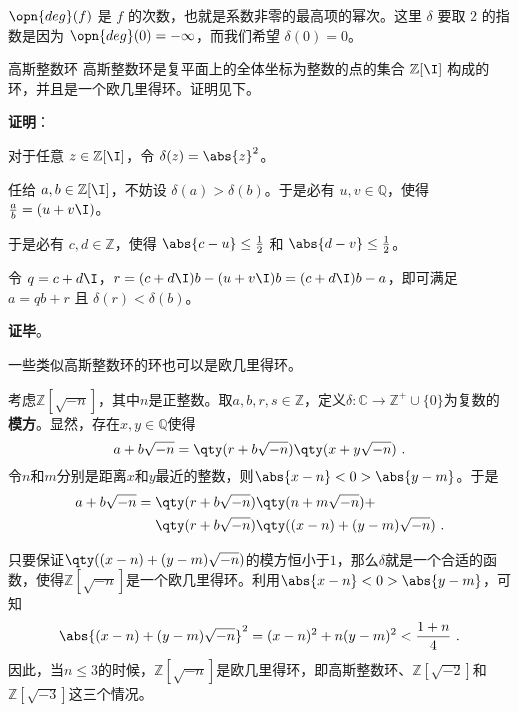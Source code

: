 $\opn{deg}(f)$ 是 $f$ 的次数，也就是系数非零的最高项的幂次。这里 $\delta$ 要取 $2$ 的指数是因为 $\opn{deg}(0)=-\infty$，而我们希望 $\delta(0)=0$。

\begin{example}{高斯整数环}
高斯整数环是复平面上的全体坐标为整数的点的集合 $\mathbb{Z}[\I]$ 构成的环，并且是一个欧几里得环。证明见下。
\end{example}

\textbf{证明}：

对于任意 $z\in\mathbb{Z}[\I]$，令 $\delta(z)=\abs{z}^2$。

任给 $a, b\in\mathbb{Z}[\I]$，不妨设 $\delta(a)>\delta(b)$。于是必有 $u, v\in\mathbb{Q}$，使得 $\frac{a}{b}=(u+v\I)$。

于是必有 $c, d\in\mathbb{Z}$，使得 $\abs{c-u}\leq\frac{1}{2}$ 和 $\abs{d-v}\leq\frac{1}{2}$。

令 $q=c+d\I$，$r=(c+d\I)b-(u+v\I)b=(c+d\I)b-a$，即可满足 $a=qb+r$ 且 $\delta(r)<\delta(b)$。

\textbf{证毕}。


一些类似高斯整数环的环也可以是欧几里得环。



\begin{example}{}\label{ex_EuRing_1}

考虑$\mathbb{Z}[\sqrt{-n}]$，其中$n$是正整数。取$a, b, r, s\in\mathbb{Z}$，定义$\delta:\mathbb{C}\to \mathbb{Z}^+\cup\{0\}$为复数的\textbf{模方}。显然，存在$x, y\in \mathbb{Q}$使得
\begin{equation}
a+b\sqrt{-n} = \qty(r+b\sqrt{-n})\qty(x+y\sqrt{-n})~. 
\end{equation}
令$n$和$m$分别是距离$x$和$y$最近的整数，则$\abs{x-n}<0>\abs{y-m}$。于是
\begin{equation}
\begin{aligned}
a+b\sqrt{-n} ={}& \qty(r+b\sqrt{-n})\qty(n+m\sqrt{-n})+\\
&\qty(r+b\sqrt{-n})\qty((x-n)+(y-m)\sqrt{-n})~. 
\end{aligned}
\end{equation}

只要保证$\qty((x-n)+(y-m)\sqrt{-n})$的模方恒小于$1$，那么$\delta$就是一个合适的函数，使得$\mathbb{Z}[\sqrt{-n}]$是一个欧几里得环。利用$\abs{x-n}<0>\abs{y-m}$，可知
\begin{equation}
\begin{aligned}
    \abs{(x-n)+(y-m)\sqrt{-n}}^2 = (x-n)^2+n(y-m)^2 < \frac{1+n}{4}~.
\end{aligned}
\end{equation}
因此，当$n\leq 3$的时候，$\mathbb{Z}[\sqrt{-n}]$是欧几里得环，即高斯整数环、$\mathbb{Z}[\sqrt{-2}]$和$\mathbb{Z}[\sqrt{-3}]$这三个情况。

\end{example}









